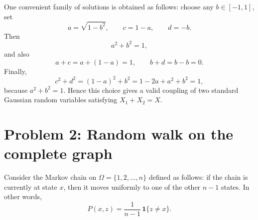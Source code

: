 \documentclass[answers,12pt,addpoints]{exam}
\begin{document}
\begin{enumerate}
\begin{solution}
  One convenient family of solutions is obtained as follows: choose any $b \in [-1,1]$, set
  \[
  a = \sqrt{1-b^2}, \qquad c = 1-a, \qquad d = -b.
  \]
  Then
  \[
  a^2+b^2=1,
  \]
  and also
  \[
  a+c = a+(1-a)=1, \qquad b+d=b-b=0.
  \]
  Finally,
  \[
  c^2+d^2 = (1-a)^2 + b^2 = 1 - 2a + a^2 + b^2 = 1,
  \]
  because $a^2+b^2=1$. Hence this choice gives a valid coupling of two standard Gaussian random variables satisfying $X_1+X_2=X$.
  \end{solution}
\end{enumerate}

\section*{Problem 2: Random walk on the complete graph}

Consider the Markov chain on $\Omega = \{1,2,\dots,n\}$ defined as follows: if the chain is currently at state $x$, then it moves uniformly to one of the other $n-1$ states. In other words,
\[
P(x,z) = \frac{1}{n-1}\,\mathbf{1}\{z \neq x\}.
\]
\end{document}
